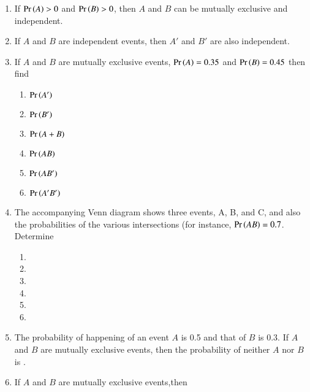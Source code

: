 \begin{enumerate}[label=\thesubsection.\arabic*,ref=\thesubsection.\theenumi,resume*]
\item 
If $\Pr\left(A\right)>0$ and $\Pr\left(B\right)>0$, then $A$ and $B$ can be mutually exclusive and independent. \\
\solution 

\item If $A$ and $B$ are independent events, then $A'$ and $B'$ are also independent.\\
\solution

\item If $A$ and $B$ are mutually exclusive events, $\Pr\left(A\right)=0.35$ and $\Pr\left(B\right)=0.45$ then find
\begin{enumerate}
\item $\Pr\left(A'\right)$
\item $\Pr\left(B'\right)$
\item $\Pr\left(A+B\right)$
\item $\Pr\left(AB\right)$
\item $\Pr\left(AB'\right)$
\item $\Pr\left(A'B'\right)$
\end{enumerate}
%
\solution 

%
\item The accompanying Venn diagram shows three events, A, B, and C, and also the probabilities of the various intersections (for instance, $\Pr\left(AB\right)=0.7$. Determine 
	\begin{enumerate}
		\item {}
		\item {}
		\item {}
		\item {}
		\item {}
		\item {}
	\end{enumerate}
	\begin{figure}[htb]
		\centering
		
		\caption {}
		\label{fig:exemplar/11/16/3/11}
	\end{figure}
		\solution
		
\item The probability of happening of an event $A$ is 0.5 and that of $B$ is 0.3. If $A$ and $B$ are mutually exclusive events, then the probability of neither $A$ nor $B$ is \underline{\phantom{Blank}}.
	\\	
\solution
		
\item If $A$ and $B$ are mutually exclusive events,then

\end{enumerate}
